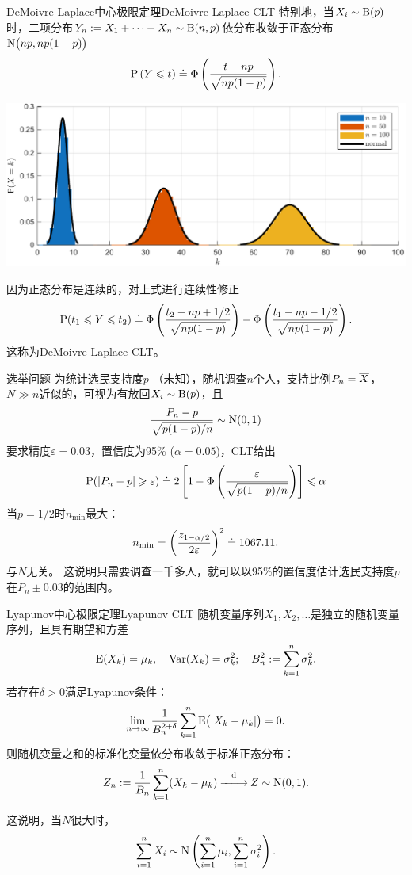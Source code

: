 \begin{example}{DeMoivre-Laplace中心极限定理}{DeMoivre-Laplace CLT}
	特别地，当$X_i\sim\operatorname{B}(p)$时，二项分布$Y_n:=X_1+\cdots+X_n\sim\operatorname{B}(n,p)$依分布收敛于正态分布$\operatorname{N}\bigl(np,np(1-p)\bigr)$
	\[
		\operatorname{P}\left(Y\leqslant t\right)\doteq\Phi\left(\frac{t-np}{\sqrt{np(1-p)}}\right).
	\]
	\begin{center}
		\includegraphics[width=0.9\linewidth]{figures/CLT_bin.pdf}
		\label{fig:CLT_bin}
	\end{center}
	因为正态分布是连续的，对上式进行连续性修正
	\[
		\operatorname{P}(t_1\leqslant Y\leqslant t_2)\doteq\Phi\left(\frac{t_2-np+1/2}{\sqrt{np(1-p)}}\right)-\Phi\left(\frac{t_1-np-1/2}{\sqrt{np(1-p)}}\right).
	\]
	这称为DeMoivre-Laplace CLT。
\end{example}
\begin{example}{选举问题}{}
	为统计选民支持度$p$ （未知），随机调查$n$个人，支持比例$P_n=\overline{X}$，$N\gg n$近似的，可视为有放回$X_i\sim\operatorname{B}(p)$，且
	\[
		\frac{P_n-p}{\sqrt{p(1-p)/n}}\sim\operatorname{N}(0,1)
	\]
	要求精度$\varepsilon=0.03$，置信度为95\% ($\alpha=0.05$)，CLT给出
	\[
		\operatorname{P}(|P_n-p|\geqslant\varepsilon)\doteq 2\left[1-\Phi\left(\frac\varepsilon{\sqrt{p(1-p)/n}}\right)\right]\leqslant\alpha
	\]
	当$p=1/2$时$n_{\mathrm{min}}$最大：
	\[
		n_{\mathrm{min}}=\biggl(\frac{z_{1-\alpha/2}}{2\varepsilon}\biggr)^2\doteq 1067.11.
	\]%
	与$N$无关。
	这说明只需要调查一千多人，就可以以95\%的置信度估计选民支持度$p$在$P_n\pm 0.03$的范围内。
\end{example}
\begin{theorem}{Lyapunov中心极限定理}{Lyapunov CLT}
	随机变量序列$X_1,X_2,\ldots$是独立的随机变量序列，且具有期望和方差
	\[
		\operatorname{E}(X_k)=\mu_k,\quad\operatorname{Var}(X_k)=\sigma_k^2;\quad B_n^2:=\sum_{k=1}^n\sigma_k^2.
	\]
	若存在$\delta>0$满足Lyapunov条件：
	\[
		\lim_{n\to\infty}\frac1{B_n^{2+\delta}}\sum_{k=1}^n\operatorname{E}\bigl(|X_k-\mu_k|\bigr)=0.
	\]
	则随机变量之和的标准化变量依分布收敛于标准正态分布：
	\begin{equation}
		\label{eq:Lyapunov CLT}
		Z_n:=\frac1{B_n}\sum_{k=1}^n(X_k-\mu_k)\overset{\text{d}}{-\hspace{-4pt}-\hspace{-5pt}\longrightarrow} Z\sim\operatorname{N}(0,1).
	\end{equation}
\end{theorem}
这说明，当$N$很大时，
\begin{equation}
	\sum_{i=1}^nX_i\overset\cdot\sim\operatorname{N}\left(\sum_{i=1}^n\mu_i,\sum_{i=1}^n\sigma^2_i\right).
\end{equation}

